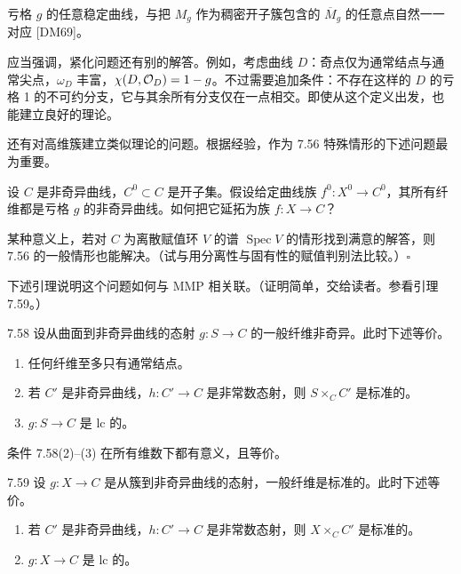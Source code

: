 
亏格 $g$ 的任意稳定曲线，与把 $M_g$ 作为稠密开子簇包含的 $\overline{M}_g$ 的任意点自然一一对应 [DM69]。

应当强调，紧化问题还有别的解答。例如，考虑曲线 $D$：奇点仅为通常结点与通常尖点，$\omega_D$ 丰富，$\chi(D,\mathcal{O}_D)=1-g$。不过需要追加条件：不存在这样的 $D$ 的亏格 1 的不可约分支，它与其余所有分支仅在一点相交。即使从这个定义出发，也能建立良好的理论。

还有对高维簇建立类似理论的问题。根据经验，作为 7.56 特殊情形的下述问题最为重要。

设 $C$ 是非奇异曲线，$C^0\subset C$ 是开子集。假设给定曲线族 $f^0\colon X^0\to C^0$，其所有纤维都是亏格 $g$ 的非奇异曲线。如何把它延拓为族 $f\colon X\to C$？

某种意义上，若对 $C$ 为离散赋值环 $V$ 的谱 $\operatorname{Spec}V$ 的情形找到满意的解答，则 7.56 的一般情形也能解决。（试与用分离性与固有性的赋值判别法比较。）\hfill$\square$

下述引理说明这个问题如何与 MMP 相关联。（证明简单，交给读者。参看引理 7.59。）

\begin{lemma*}{7.58}
设从曲面到非奇异曲线的态射 $g\colon S\to C$ 的一般纤维非奇异。此时下述等价。
\begin{enumerate}[label=(\arabic*),leftmargin=2.4em,itemsep=1pt,topsep=2pt,parsep=0pt]
\item 任何纤维至多只有通常结点。
\item 若 $C'$ 是非奇异曲线，$h\colon C'\to C$ 是非常数态射，则 $S\times_C C'$ 是标准的。
\item $g\colon S\to C$ 是 lc 的。
\end{enumerate}
\end{lemma*}

条件 7.58(2)–(3) 在所有维数下都有意义，且等价。

\begin{lemmap}{7.59}
设 $g\colon X\to C$ 是从簇到非奇异曲线的态射，一般纤维是标准的。此时下述等价。
\begin{enumerate}[label=(\arabic*),leftmargin=2.4em,itemsep=1pt,topsep=2pt,parsep=0pt]
\item 若 $C'$ 是非奇异曲线，$h\colon C'\to C$ 是非常数态射，则 $X\times_C C'$ 是标准的。
\item $g\colon X\to C$ 是 lc 的。
\end{enumerate}
\end{lemmap}

